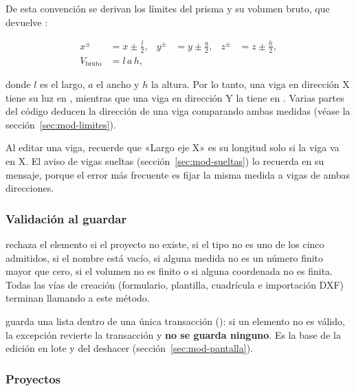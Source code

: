 De esta convención se derivan los límites del prisma y su volumen bruto, que devuelve :

\begin{align}
	x^{\pm} &= x \pm \tfrac{l}{2}, & y^{\pm} &= y \pm \tfrac{a}{2}, & z^{\pm} &= z \pm \tfrac{h}{2},
	\label{eq:mod-limites} \\
	V_{\text{bruto}} &= l \, a \, h ,
\end{align}

\noindent donde $l$ es el largo, $a$ el ancho y $h$ la altura. Por lo tanto, una viga en dirección X tiene su luz en
, mientras que una viga en dirección Y la tiene en . Varias partes del código deducen la
dirección de una viga comparando ambas medidas (véase la sección~\ref{sec:mod-limites}).

\begin{importante}
	Al editar una viga, recuerde que «Largo eje X» es su longitud solo si la viga va en X. El aviso de vigas sueltas
	(sección~\ref{sec:mod-sueltas}) lo recuerda en su mensaje, porque el error más frecuente es fijar la misma medida a
	vigas de ambas direcciones.
\end{importante}

\subsubsection{Validación al guardar}

 rechaza el elemento si el proyecto no existe, si el tipo
no es uno de los cinco admitidos, si el nombre está vacío, si alguna medida no es un número finito mayor que cero, si el
volumen no es finito o si alguna coordenada no es finita. Todas las vías de creación (formulario, plantilla, cuadrícula
e importación DXF) terminan llamando a este método.

 guarda una lista dentro de una única transacción ():
si un elemento no es válido, la excepción revierte la transacción y \textbf{no se guarda ninguno}. Es la base de la
edición en lote y del deshacer (sección~\ref{sec:mod-pantalla}).

\subsubsection{Proyectos}

